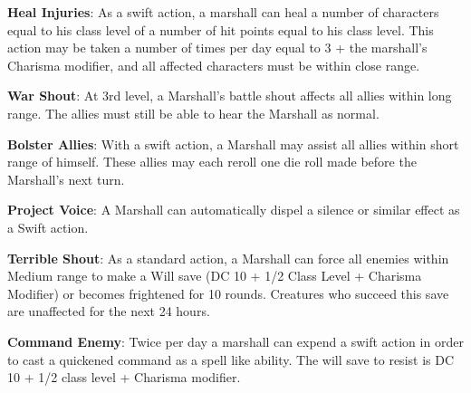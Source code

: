 \textbf{Heal Injuries}: As a swift action, a marshall can heal a number of characters equal to his class level of a number of hit points equal to his class level. This action may be taken a number of times per day equal to 3 + the marshall’s Charisma modifier, and all affected characters must be within close range.

\textbf{War Shout}: At 3rd level, a Marshall’s battle shout affects all allies within long range. The allies must still be able to hear the Marshall as normal.

\textbf{Bolster Allies}: With a swift action, a Marshall may assist all allies within short range of himself. These allies may each reroll one die roll made before the Marshall’s next turn.  

\textbf{Project Voice}: A Marshall can automatically dispel a silence or similar effect as a Swift action.

\textbf{Terrible Shout}: As a standard action, a Marshall can force all enemies within Medium range to make a Will save (DC 10 + 1/2 Class Level + Charisma Modifier) or becomes frightened for 10 rounds. Creatures who succeed this save are unaffected for the next 24 hours.

\textbf{Command Enemy}: Twice per day a marshall can expend a swift action in order to cast a quickened command as a spell like ability. The will save to resist is DC 10 + 1/2 class level + Charisma modifier.